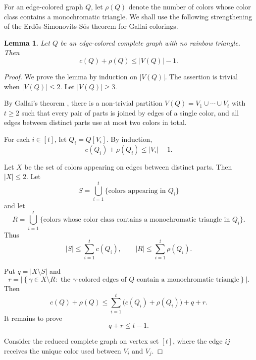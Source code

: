 \documentclass[10pt,a4paper]{article}
\newtheorem{lemma}[theorem]{Lemma}
\theoremstyle{definition}
\begin{document}
For an edge-colored graph $Q$, let $\rho(Q)$ denote the number of colors whose color class contains a monochromatic triangle.
We shall use the following strengthening of the Erd\H{o}s-Simonovits-S\'os theorem for Gallai colorings.

\begin{lemma}\label{lem:gallai-rho}
    Let $Q$ be an edge-colored complete graph with no rainbow triangle. Then
    \begin{equation}\label{eq:gallai-rho}
        c(Q)+\rho(Q)\le |V(Q)|-1.
    \end{equation}
\end{lemma}

\begin{proof}
    We prove the lemma by induction on $|V(Q)|$.
    The assertion is trivial when $|V(Q)|\le2$.
    Let $|V(Q)|\ge3$.

    By Gallai's theorem \cite{gallai}, there is a non-trivial partition $V(Q)=V_1\cup\cdots\cup V_t$ with $t\ge2$ such that every pair of parts is joined by edges of a single color, and all edges between distinct parts use at most two colors in total.

    For each $i\in[t]$, let $Q_i=Q[V_i]$.  By induction,
    \[
        c(Q_i)+\rho(Q_i)\le |V_i|-1.
    \]

    Let $X$ be the set of colors appearing on edges between distinct parts.
    Then $|X|\le2$.  Let
    \[
        S=\bigcup_{i=1}^t \{\text{colors appearing in }Q_i\}
    \]
    and let
    \[
        R=\bigcup_{i=1}^t
        \{\text{colors whose color class contains a monochromatic triangle in }Q_i\}.
    \]
    Thus
    \[
        |S|\le\sum_{i=1}^t c(Q_i),
        \qquad
        |R|\le\sum_{i=1}^t \rho(Q_i).
    \]

    Put $q=|X\setminus S|$ and
    \[
        r=
        \left|
        \left\{
        \gamma\in X\setminus R:
        \text{ the $\gamma$-colored edges of $Q$ contain a monochromatic triangle}
        \right\}
        \right|.
    \]
    Then
    \begin{equation}\label{eq:gallai-rho-reduction}
        c(Q)+\rho(Q)
        \le
        \sum_{i=1}^t\bigl(c(Q_i)+\rho(Q_i)\bigr)+q+r.
    \end{equation}
    It remains to prove
    \begin{equation}\label{eq:q-plus-r}
        q+r\le t-1.
    \end{equation}

    Consider the reduced complete graph on vertex set $[t]$, where the edge
    $ij$ receives the unique color used between $V_i$ and $V_j$.


\end{proof}
\end{document}
